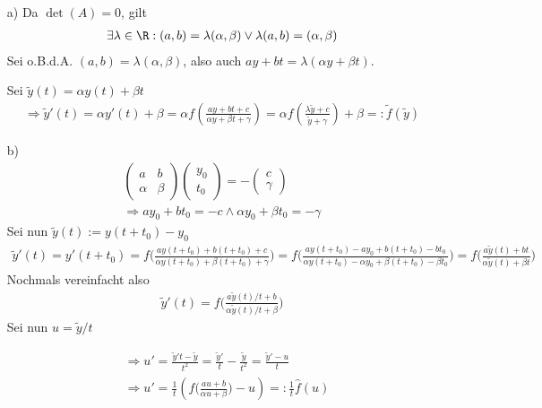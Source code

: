 \begin{solution}
\begin{itemize}
  \item[a)]
  Da $\det(A) = 0$, gilt
  \begin{align*}
    \exists \lambda \in \R: (a,b) = \lambda (\alpha, \beta) \lor \lambda (a,b) = (\alpha, \beta)
  \end{align*}
  Sei o.B.d.A. $(a,b) = \lambda (\alpha, \beta)$, also auch $ay + bt = \lambda (\alpha y + \beta t)$.

  Sei $\tilde{y}(t) = \alpha y(t) + \beta t$
  \begin{align*}
    \Rightarrow \tilde{y}'(t) = \alpha y'(t) + \beta = \alpha f\left(\frac{ay + bt + c}{\alpha y + \beta t + \gamma}\right) = \alpha
    f\left(\frac{\lambda \tilde{y} + c}{\tilde{y} + \gamma}\right) + \beta =: \tilde{f}(\tilde{y})
  \end{align*}

  \item[b)]
  \begin{align*}
  \left(
    \begin{array}{cc}
      a & b \\
      \alpha & \beta
    \end{array}
  \right)\left(
    \begin{array}{c}
      y_0 \\
      t_0
    \end{array}
    \right) = -\left(
    \begin{array}{c}
      c \\
      \gamma
    \end{array}
    \right) \\
    \Rightarrow ay_0 + bt_0 = -c \land \alpha y_0 + \beta t_0 = -\gamma
  \end{align*}
  Sei nun $\tilde{y}(t) := y(t + t_0 ) - y_0$
  \begin{align*}
    \tilde{y}'(t) = y'(t + t_0 ) = f \bigg(\frac{ay(t+t_0) + b(t+t_0) + c}{\alpha y(t+t_0) + \beta (t+t_0) + \gamma}\bigg) = f\bigg(\frac{ay(t+t_0) - ay_0 + b(t+t_0) - bt_0}{\alpha y(t+t_0) -\alpha y_0 + \beta (t+t_0) - \beta t_0}
    \bigg) = f \bigg(\frac{a\tilde{y}(t) + bt}{\alpha \tilde{y}(t) + \beta t}\bigg)
  \end{align*}
  Nochmals vereinfacht also
  \begin{align*}
    \tilde{y}'(t) = f \bigg(\frac{a\tilde{y}(t)/t + b}{\alpha \tilde{y}(t)/t + \beta }\bigg)
  \end{align*}
  Sei nun $u = \tilde{y}/t$

  \begin{align*}
    &\Rightarrow u' = \frac{\tilde{y}' t - \tilde{y}}{t^{2}} = \frac{\tilde{y}'}{t} - \frac{\tilde{y}}{t^{2}} = \frac{\tilde{y}'- u}{t} \\
    &\Rightarrow u' = \frac{1}{t} \left(f \bigg(\frac{au + b}{\alpha u + \beta }\bigg) - u\right) =: \frac{1}{t} \hat{f}(u)
  \end{align*}
\end{itemize}
\end{solution}
